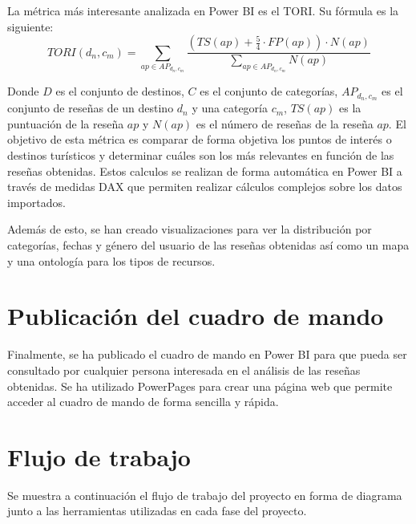 La métrica más interesante analizada en Power BI es el TORI. Su fórmula es la siguiente:
\begin{equation}
    TORI(d_n, c_m) = \sum_{ap \in AP_{d_n, c_m}} \frac{\left( TS(ap) + \frac{5}{4} \cdot FP(ap) \right) \cdot N(ap)}{\sum_{ap \in AP_{d_n, c_m}} N(ap)}
\end{equation} 

Donde $D$ es el conjunto de destinos, $C$ es el conjunto de categorías, $AP_{d_n,c_m}$ es el conjunto de reseñas de un destino $d_n$ y una categoría $c_m$, $TS(ap)$ es la puntuación de la reseña $ap$ y $N(ap)$ es el número de reseñas de la reseña $ap$.
El objetivo de esta métrica es comparar de forma objetiva los puntos de interés o destinos turísticos y determinar cuáles son los más relevantes en función de las reseñas obtenidas.
Estos calculos se realizan de forma automática en Power BI a través	de medidas DAX que permiten realizar cálculos complejos sobre los datos importados.

Además de esto, se han creado visualizaciones para ver la distribución por categorías, fechas y género del usuario de las reseñas obtenidas así como un mapa y una ontología para los tipos de recursos.

\newpage

\section{Publicación del cuadro de mando}

Finalmente, se ha publicado el cuadro de mando en Power BI para que pueda ser consultado por cualquier persona interesada en el análisis de las reseñas obtenidas.
Se ha utilizado PowerPages para crear una página web que permite acceder al cuadro de mando de forma sencilla y rápida.


\section{Flujo de trabajo}

Se muestra a continuación el flujo de trabajo del proyecto en forma de diagrama junto a
las herramientas utilizadas en cada fase del proyecto.

